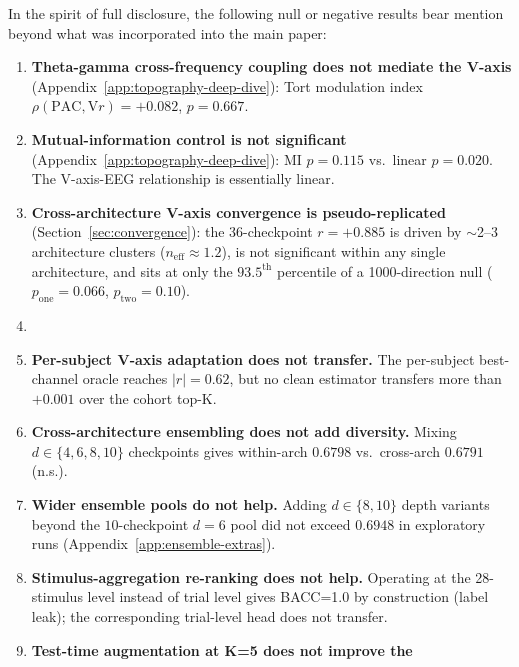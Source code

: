 In the spirit of full disclosure, the following null or negative results
bear mention beyond what was incorporated into the main paper:
\begin{enumerate}
\item \textbf{Theta-gamma cross-frequency coupling does not mediate the
V-axis} (Appendix~\ref{app:topography-deep-dive}): Tort modulation index
$\rho(\mathrm{PAC}, \mathrm{V}r) = +0.082$, $p=0.667$.
\item \textbf{Mutual-information control is not significant}
(Appendix~\ref{app:topography-deep-dive}): MI $p=0.115$ vs.\ linear $p=0.020$.
The V-axis-EEG relationship is essentially linear.
\item \textbf{Cross-architecture V-axis convergence is
pseudo-replicated} (Section~\ref{sec:convergence}): the 36-checkpoint
$r=+0.885$ is driven by $\sim$2--3 architecture clusters
($n_{\mathrm{eff}}\approx1.2$), is not significant within any single
architecture, and sits at only the $93.5^\mathrm{th}$ percentile of a
1000-direction null ($p_{\mathrm{one}}=0.066$, $p_{\mathrm{two}}=0.10$).
\item {}
\item \textbf{Per-subject V-axis adaptation does not transfer.} The
per-subject best-channel oracle reaches $|r|=0.62$, but no clean
estimator transfers more than $+0.001$ over the cohort top-K.
\item \textbf{Cross-architecture ensembling does not add diversity.}
Mixing $d \in \{4, 6, 8, 10\}$ checkpoints gives within-arch $0.6798$
vs.\ cross-arch $0.6791$ (n.s.).
\item \textbf{Wider ensemble pools do not help.} Adding $d{\in}\{8,10\}$
depth variants beyond the $10$-checkpoint $d{=}6$ pool did not exceed
$0.6948$ in exploratory runs (Appendix~\ref{app:ensemble-extras}).
\item \textbf{Stimulus-aggregation re-ranking does not help.} Operating
at the 28-stimulus level instead of trial level gives BACC=1.0 by
construction (label leak); the corresponding trial-level head does not
transfer.
\item \textbf{Test-time augmentation at K=5 does not improve the
}
\end{enumerate}
